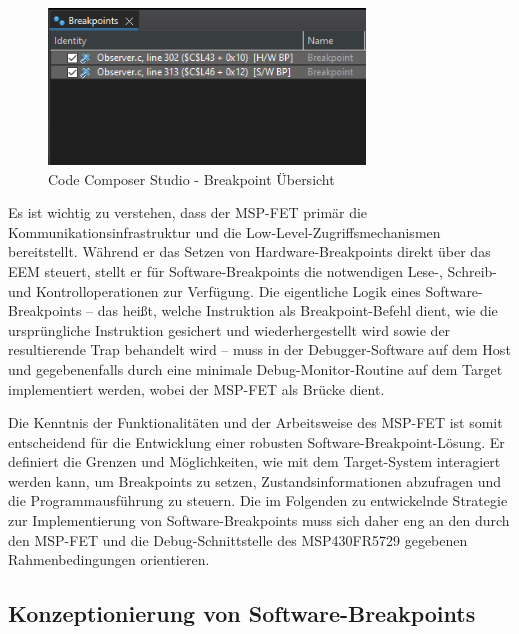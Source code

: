 \begin{figure}[h!]
	\centering
	\includegraphics[width=0.75\textwidth]{../Bilder/HW_SW_Breakpoint.png}
	\caption{Code Composer Studio - Breakpoint \"Ubersicht}
	\label{fig:CCS_SetBR}
\end{figure}

\newpage
Es ist wichtig zu verstehen, dass der MSP-FET prim\"ar die Kommunikationsinfrastruktur und die Low-Level-Zugriffsmechanismen bereitstellt. W\"ahrend er das Setzen von Hardware-Breakpoints direkt \"uber das EEM steuert, stellt er f\"ur Software-Breakpoints die notwendigen Lese-, Schreib- und Kontrolloperationen zur Verf\"ugung. Die eigentliche Logik eines Software-Breakpoints – das hei{\ss}t, welche Instruktion als Breakpoint-Befehl dient, wie die urspr\"ungliche Instruktion gesichert und wiederhergestellt wird sowie der resultierende Trap behandelt wird – muss in der Debugger-Software auf dem Host und gegebenenfalls durch eine minimale Debug-Monitor-Routine auf dem Target implementiert werden, wobei der MSP-FET als Br\"ucke dient. 

Die Kenntnis der Funktionalit\"aten und der Arbeitsweise des MSP-FET ist somit entscheidend f\"ur die Entwicklung einer robusten Software-Breakpoint-L\"osung. Er definiert die Grenzen und M\"oglichkeiten, wie mit dem Target-System interagiert werden kann, um Breakpoints zu setzen, Zustandsinformationen abzufragen und die Programmausf\"uhrung zu steuern. Die im Folgenden zu entwickelnde Strategie zur Implementierung von Software-Breakpoints muss sich daher eng an den durch den MSP-FET und die Debug-Schnittstelle des MSP430FR5729 gegebenen Rahmenbedingungen orientieren.


\newpage
\subsection{Konzeptionierung von Software-Breakpoints}
\label{sec:KonzeptionierungSoftwareBreakpoints}

